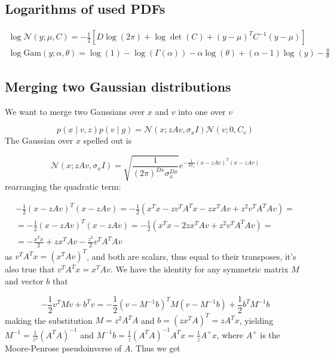 \documentclass{paper}
\begin{document}
\subsection{Logarithms of used PDFs} \label{sec:logpdf}

\begin{eqnarray}
\log  \mathcal{N}(y;\mu,C) = -\frac{1}{2} \left[D \log (2\pi) + \log \det (C) + (y - \mu)^T C^{-1} (y-\mu) \right] \\
\log  \textrm{Gam}(y;\alpha,\theta) = \log(1) - \log(\Gamma(\alpha)) - \alpha \log(\theta) + (\alpha-1) \log(y) - \frac{y}{\theta}
\end{eqnarray}

\subsection{Merging two Gaussian distributions} \label{sec:mergegauss}

We want to merge two Gaussians over $x$ and $v$ into one over $v$

\begin{equation}
p(x \mid v,z) p(v \mid g) = \mathcal{N}(x;zAv,\sigma_x I) \mathcal{N}(v;0,C_v)
\end{equation}
%
The Gaussian over $x$ spelled out is

\begin{equation} 
\mathcal{N}(x;zAv,\sigma_x I) = \sqrt{\frac{1}{(2\pi)^{Dx} \sigma_x^{Dx}}}e^{-\frac{1}{2 \sigma_x} (x-zAv)^T(x-zAv)}
\end{equation}
%
rearranging the quadratic term:

\begin{equation} \label{eq:quad_rearrange}
\begin{split}
-\frac{1}{2} (x-zAv)^T(x-zAv) = -\frac{1}{2} (x^Tx - zv^TA^Tx - zx^TAv + z^2 v^TA^TAv) = \\
= -\frac{1}{2} (x-zAv)^T(x-zAv) = -\frac{1}{2} (x^Tx - 2zx^TAv + z^2 v^TA^TAv) = \\
= -\frac{x^Tx}{2} + zx^TAv -\frac{z^2}{2} v^TA^TAv
\end{split}
\end{equation}
%
as $v^TA^Tx = (x^TAv)^T$, and both are scalars, thus equal to their transposes, it's also true that $v^TA^Tx = x^TAv$. We have the identity for any symmetric matrix $M$ and vector $b$ that

\begin{equation} 
-\frac{1}{2} v^T M v + b^Tv = -\frac{1}{2} (v - M^{-1}b)^T M (v - M^{-1}b) + \frac{1}{2}b^T M^{-1} b
\end{equation}
%
making the substitution $M = z^2A^TA$ and $b = (zx^TA)^T=zA^Tx$, yielding $M^{-1} = \frac{1}{z^2}(A^TA)^{-1}$ and $M^{-1} b = \frac{1}{z}(A^TA)^{-1}A^Tx = \frac{1}{z}A^{+}x$, where $A^{+}$ is the Moore-Penrose pseudoinverse of $A$. Thus we get
\end{document}
